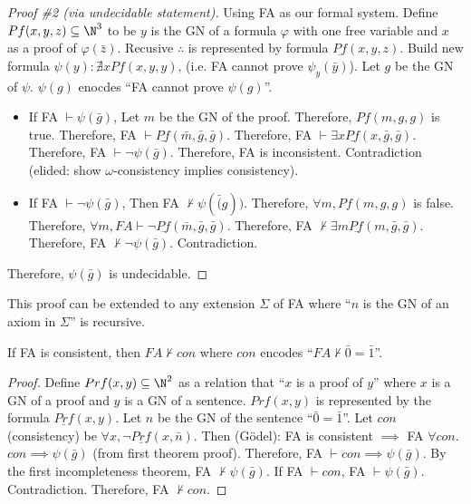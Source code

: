 \documentclass{article}
\begin{document}
\begin{theorem}
    \begin{proof}[Proof \#2 (via undecidable statement)]
        Using FA as our formal system.
        Define \(Pf(x,y,z)\subseteq\N^3\) to be
        \(y\) is the GN of a formula \(\varphi\) with one free variable
        and \(x\) as a proof of \(\varphi(\bar{z})\). 
        Recusive \(\therefore\) is represented by formula \(\underline{Pf}(x,y,z)\).
        Build new formula \(\psi(y):\nexists x Pf(x,y,y)\),
        (i.e. FA cannot prove \(\psi_y(\bar{y})\)).
        Let \(g\) be the GN of \(\psi\).
        \(\psi(g)\) enocdes ``FA cannot prove \(\psi(g)\)''.
        
        \begin{itemize}
            \item If FA \(\vdash \psi(\bar{g})\),
        Let \(m\) be the GN of the proof.
        Therefore, \(Pf(m,g,g)\) is true.
        Therefore, FA \(\vdash \underline{Pf}(\bar{m}, \bar{g}, \bar{g})\).
        Therefore, FA \(\vdash \exists x\underline{Pf}(x, \bar{g}, \bar{g})\).
        Therefore, FA \(\vdash \lnot\psi(\bar{g})\).
        Therefore, FA is inconsistent.
        Contradiction (elided: show \(\omega\)-consistency implies consistency).
            \item If FA \(\vdash \lnot\psi(\bar{g})\),
        Then FA \(\nvdash \psi(\bar(g))\).
        Therefore, \(\forall m, Pf(m,g,g)\) is false.
        Therefore, \(\forall m, FA \vdash \lnot\underline{Pf}(\bar{m}, \bar{g}, \bar{g})\).
        Therefore, FA \(\nvdash \exists m \underline{Pf}(m, \bar{g}, \bar{g})\).
        Therefore, FA \(\nvdash \lnot \psi(\bar{g})\).
        Contradiction.
        \end{itemize}
        Therefore, \(\psi(\bar{g})\) is undecidable.
    \end{proof}
    
    This proof can be extended to any extension \(\Sigma\) of FA
    where ``\(n\) is the GN of an axiom in \(\Sigma\)'' is recursive.
\end{theorem}
\begin{theorem}
    If FA is consistent,
    then \(FA \nvdash con\) where \(con\) encodes ``\(FA \nvdash \bar{0} = \bar{1}\)''.
    
    \begin{proof}
        Define \(Prf(x,y) \subseteq \N^2\)
        as a relation that ``\(x\) is a proof of \(y\)''
        where \(x\) is a GN of a proof and \(y\) is a GN of a sentence.
        \(Prf(x,y)\) is represented by the formula \(\underline{Prf}(x,y)\).
        Let \(n\) be the GN of the sentence ``\(\bar{0}=\bar{1}\)''.
        Let \(con\) (consistency) be \(\forall x, \lnot \underline{Prf}(x,\bar{n})\).
        Then (Gödel): FA is consistent \(\implies\) FA \(\forall con\).
        \(con \implies \psi(\bar{g})\) (from first theorem proof).
        Therefore, FA \(\vdash con \implies \psi(\bar{g})\).
        By the first incompleteness theorem, FA \(\nvdash \psi(\bar{g})\).
        If FA \(\vdash con\), FA \(\vdash \psi(\bar{g})\). Contradiction.
        Therefore, FA \(\nvdash con\).
    \end{proof}
\end{theorem}
\end{document}
